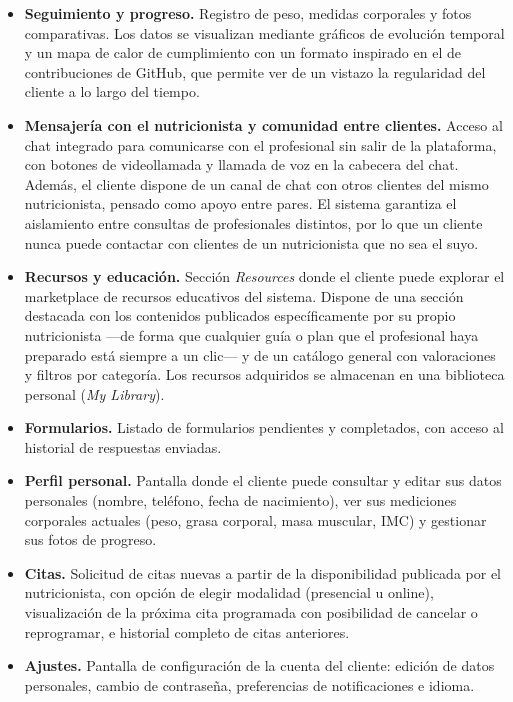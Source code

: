 \begin{itemize}
    \item \textbf{Seguimiento y progreso.} Registro de peso, medidas corporales y fotos comparativas. Los datos se visualizan mediante gráficos de evolución temporal y un mapa de calor de cumplimiento con un formato inspirado en el de contribuciones de GitHub, que permite ver de un vistazo la regularidad del cliente a lo largo del tiempo.

    \item \textbf{Mensajería con el nutricionista y comunidad entre clientes.} Acceso al chat integrado para comunicarse con el profesional sin salir de la plataforma, con botones de videollamada y llamada de voz en la cabecera del chat. Además, el cliente dispone de un canal de chat con otros clientes del mismo nutricionista, pensado como apoyo entre pares. El sistema garantiza el aislamiento entre consultas de profesionales distintos, por lo que un cliente nunca puede contactar con clientes de un nutricionista que no sea el suyo.

    \item \textbf{Recursos y educación.} Sección \textit{Resources} donde el cliente puede explorar el marketplace de recursos educativos del sistema. Dispone de una sección destacada con los contenidos publicados específicamente por su propio nutricionista ---de forma que cualquier guía o plan que el profesional haya preparado está siempre a un clic--- y de un catálogo general con valoraciones y filtros por categoría. Los recursos adquiridos se almacenan en una biblioteca personal (\textit{My Library}).

    \item \textbf{Formularios.} Listado de formularios pendientes y completados, con acceso al historial de respuestas enviadas.

    \item \textbf{Perfil personal.} Pantalla donde el cliente puede consultar y editar sus datos personales (nombre, teléfono, fecha de nacimiento), ver sus mediciones corporales actuales (peso, grasa corporal, masa muscular, IMC) y gestionar sus fotos de progreso.

    \item \textbf{Citas.} Solicitud de citas nuevas a partir de la disponibilidad publicada por el nutricionista, con opción de elegir modalidad (presencial u online), visualización de la próxima cita programada con posibilidad de cancelar o reprogramar, e historial completo de citas anteriores.

    \item \textbf{Ajustes.} Pantalla de configuración de la cuenta del cliente: edición de datos personales, cambio de contraseña, preferencias de notificaciones e idioma.
\end{itemize}

